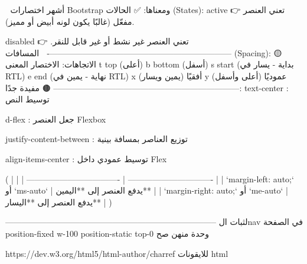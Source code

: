 🧠 أشهر اختصارات Bootstrap ومعناها:
✅ الحالات (States):
active 👉 تعني العنصر مفعّل (غالبًا يكون لونه أبيض أو مميز).

disabled 👉 تعني العنصر غير نشط أو غير قابل للنقر.
-------------------------------------------------------------------
🔵 المسافات (Spacing):
🟡 الاتجاهات:
الاختصار	المعنى
t	top (أعلى)
b	bottom (أسفل)
s	start (بداية - يسار في RTL)
e	end (نهاية - يمين في RTL)
x	أفقيًا (يمين ويسار)
y	عموديًا (أعلى وأسفل)
--------------------------------------------------------------------
🟤 مفيدة جدًا:
text-center : توسيط النص

d-flex : جعل العنصر Flexbox

justify-content-between : توزيع العناصر بمسافة بينية

align-items-center : توسيط عمودي داخل Flex

(
|  |
| ---------------------------------- | ------------------------------- |
| `margin-left: auto;` أو `ms-auto`  | يدفع العنصر إلى **اليمين**      |
| `margin-right: auto;` أو `me-auto` | يدفع العنصر إلى **اليسار**      |
)

-----------------------------------------------------------------------------
لثبات الnav في الصفحة 
position-fixed w-100
position-static top-0
وحدة منهن صح


https://dev.w3.org/html5/html-author/charref
للايقونات html